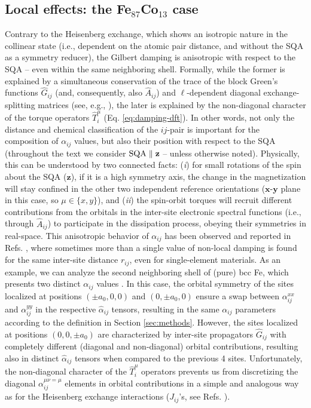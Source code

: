 \subsection{Local effects: the Fe$_{87}$Co$_{13}$ case}
\label{subsec:local-effects-detailed}

Contrary to the Heisenberg exchange, which shows an isotropic nature in the collinear state (i.e., dependent on the atomic pair distance, and without the SQA as a symmetry reducer), the Gilbert damping is anisotropic with respect to the SQA -- even within the same neighboring shell. Formally, while the former is explained by a simultaneous conservation of the trace of the block Green's functions $\hat{G}_{ij}$ (and, consequently, also $\hat{A}_{ij}$) and $\ell$-dependent diagonal exchange-splitting matrices (see, e.g., \cite{PhysRevB.62.5293,PhysRevB.91.125133}), the later is explained by the non-diagonal character of the torque operators $\hat{T}_i^{\mu}$ (Eq. \ref{eq:damping-dft}). In other words, not only the distance and chemical classification of the $ij$-pair is important for the composition of $\alpha_{ij}$ values, but also their position with respect to the SQA (throughout the text we consider $\textnormal{SQA}\parallel\mathbf{z}$ -- unless otherwise noted). Physically, this can be understood by two connected facts: (\textit{i}) for small rotations of the spin about the SQA ($\mathbf{z}$), if it is a high symmetry axis,  the change in the magnetization will stay confined in the other two independent reference orientations ($\mathbf{x}$-$\mathbf{y}$ plane in this case, so $\mu\in\{x,y\}$), and (\textit{ii})  the spin-orbit torques will recruit different contributions from the orbitals in the inter-site electronic spectral functions (i.e., through $\hat{A}_{ij}$) to participate in the dissipation process, obeying their symmetries in real-space. This anisotropic behavior of $\alpha_{ij}$ has been observed and reported in Refs. \cite{PhysRevB.103.L220405,PhysRevB.108.014433,PhysRevMaterials.2.013801}, where sometimes more than a single value of non-local damping is found for the same inter-site distance $r_{ij}$, even for single-element materials. As an example, we can analyze the second neighboring shell of (pure) bcc Fe, which presents two distinct $\alpha_{ij}$ values \cite{PhysRevB.108.014433}. In this case, the orbital symmetry of the sites localized at positions $(\pm a_0,0,0)$ and $(0,\pm a_0,0)$ ensure a swap between $\alpha_{ij}^{xx}$ and $\alpha_{ij}^{yy}$ in the respective $\hat{\alpha}_{ij}$ tensors, resulting in the same $\alpha_{ij}$ parameters according to the definition in Section \ref{sec:methods}. However, the sites localized at positions $(0,0,\pm a_0)$ are characterized by inter-site propagators $\hat{G}_{ij}$ with completely different (diagonal and non-diagonal) orbital contributions, resulting also in distinct $\hat{\alpha}_{ij}$ tensors when compared to the previous 4 sites. Unfortunately, the non-diagonal character of the $\hat{T}_i^{\mu}$ operators prevents us from discretizing the diagonal $\alpha_{ij}^{\mu\nu=\mu}$ elements in orbital contributions in a simple and analogous way as for the Heisenberg exchange interactions ($J_{ij}$'s, see Refs. \cite{PhysRevB.91.224405,PhysRevLett.116.217202}).

